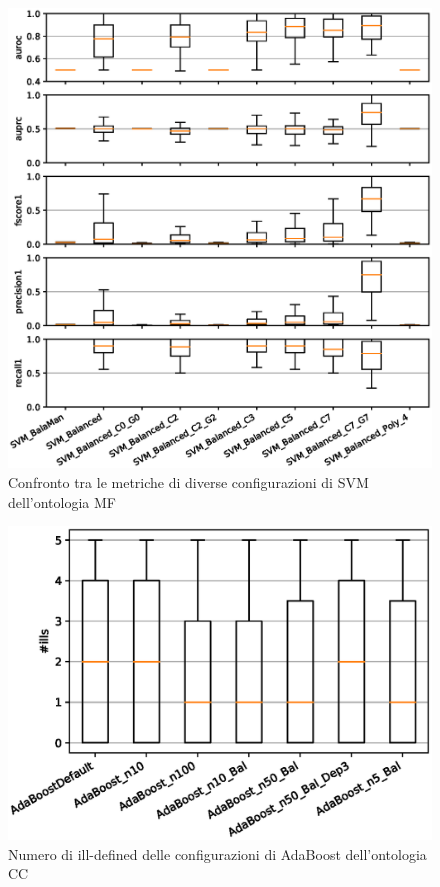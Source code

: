 \documentclass[12pt,a4paper,oneside,hidelinks]{report}
\begin{document}
\begin{figure}[hb]%
    \centering
    \includegraphics[scale = 0.80]{MF-SVM-level1.eps}%
    \caption{Confronto tra le metriche di diverse configurazioni di SVM dell'ontologia MF}%
    \label{figure:liv1.4}%
\end{figure}

\vspace*{\fill}



\vspace*{\fill}

\begin{figure}[ht]%
    \centering
    \includegraphics[scale = 0.80]{CC-AdaBoost-ills.eps}%
    \caption{Numero di ill-defined delle configurazioni di AdaBoost dell'ontologia CC}
    \label{fig:ill1} 
\end{figure}
\end{document}
